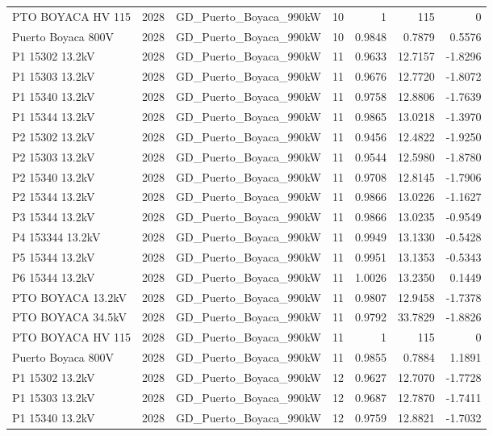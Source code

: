 \documentclass[11pt,a4paper]{article}
\begin{document}
\begin{longtable}{llllrrr}
PTO BOYACA HV 115 & 2028 & GD\_Puerto\_Boyaca\_990kW & 10 & 1 & 115 & 0 \\
Puerto Boyaca 800V & 2028 & GD\_Puerto\_Boyaca\_990kW & 10 & 0.9848 & 0.7879 & 0.5576 \\
P1 15302 13.2kV & 2028 & GD\_Puerto\_Boyaca\_990kW & 11 & 0.9633 & 12.7157 & -1.8296 \\
P1 15303 13.2kV & 2028 & GD\_Puerto\_Boyaca\_990kW & 11 & 0.9676 & 12.7720 & -1.8072 \\
P1 15340 13.2kV & 2028 & GD\_Puerto\_Boyaca\_990kW & 11 & 0.9758 & 12.8806 & -1.7639 \\
P1 15344 13.2kV & 2028 & GD\_Puerto\_Boyaca\_990kW & 11 & 0.9865 & 13.0218 & -1.3970 \\
P2 15302 13.2kV & 2028 & GD\_Puerto\_Boyaca\_990kW & 11 & 0.9456 & 12.4822 & -1.9250 \\
P2 15303 13.2kV & 2028 & GD\_Puerto\_Boyaca\_990kW & 11 & 0.9544 & 12.5980 & -1.8780 \\
P2 15340 13.2kV & 2028 & GD\_Puerto\_Boyaca\_990kW & 11 & 0.9708 & 12.8145 & -1.7906 \\
P2 15344 13.2kV & 2028 & GD\_Puerto\_Boyaca\_990kW & 11 & 0.9866 & 13.0226 & -1.1627 \\
P3 15344 13.2kV & 2028 & GD\_Puerto\_Boyaca\_990kW & 11 & 0.9866 & 13.0235 & -0.9549 \\
P4 153344 13.2kV & 2028 & GD\_Puerto\_Boyaca\_990kW & 11 & 0.9949 & 13.1330 & -0.5428 \\
P5 15344 13.2kV & 2028 & GD\_Puerto\_Boyaca\_990kW & 11 & 0.9951 & 13.1353 & -0.5343 \\
P6 15344 13.2kV & 2028 & GD\_Puerto\_Boyaca\_990kW & 11 & 1.0026 & 13.2350 & 0.1449 \\
PTO BOYACA 13.2kV & 2028 & GD\_Puerto\_Boyaca\_990kW & 11 & 0.9807 & 12.9458 & -1.7378 \\
PTO BOYACA 34.5kV & 2028 & GD\_Puerto\_Boyaca\_990kW & 11 & 0.9792 & 33.7829 & -1.8826 \\
PTO BOYACA HV 115 & 2028 & GD\_Puerto\_Boyaca\_990kW & 11 & 1 & 115 & 0 \\
Puerto Boyaca 800V & 2028 & GD\_Puerto\_Boyaca\_990kW & 11 & 0.9855 & 0.7884 & 1.1891 \\
P1 15302 13.2kV & 2028 & GD\_Puerto\_Boyaca\_990kW & 12 & 0.9627 & 12.7070 & -1.7728 \\
P1 15303 13.2kV & 2028 & GD\_Puerto\_Boyaca\_990kW & 12 & 0.9687 & 12.7870 & -1.7411 \\
P1 15340 13.2kV & 2028 & GD\_Puerto\_Boyaca\_990kW & 12 & 0.9759 & 12.8821 & -1.7032 \\

\end{longtable}
\end{document}
